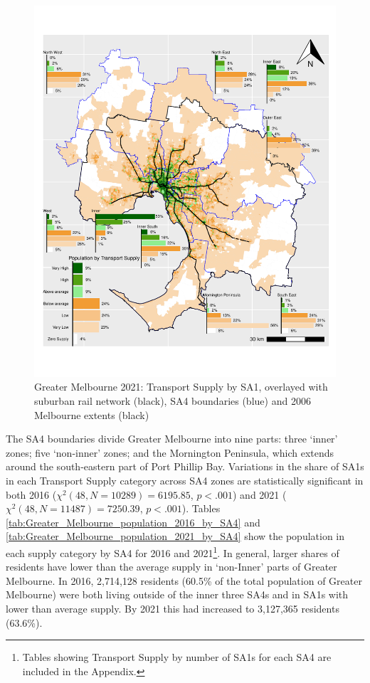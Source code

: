\documentclass[preprint, 3p,
authoryear]{elsarticle} %
\begin{document}
\begin{figure}
\includegraphics[width=1\linewidth]{ReynoldsCurrieQu2024_files/figure-latex/Greater_Melbourne_population_2021_by_SA4-1} \caption{Greater Melbourne 2021: Transport Supply by SA1,  overlayed with suburban rail network (black), SA4 boundaries (blue) and 2006 Melbourne extents (black)}\label{fig:Greater_Melbourne_population_2021_by_SA4}
\end{figure}

The SA4 boundaries divide Greater Melbourne into nine parts: three
`inner' zones; five `non-inner' zones; and the Mornington Peninsula,
which extends around the south-eastern part of Port Phillip Bay.
Variations in the share of SA1s in each Transport Supply category across
SA4 zones are statistically significant in both 2016
(\(\chi^2(48, N = 10289) = 6195.85\), \(p < .001\)) and 2021
(\(\chi^2(48, N = 11487) = 7250.39\), \(p < .001\)). Tables
\ref{tab:Greater_Melbourne_population_2016_by_SA4} and
\ref{tab:Greater_Melbourne_population_2021_by_SA4} show the population
in each supply category by SA4 for 2016 and 2021\footnote{Tables showing
  Transport Supply by number of SA1s for each SA4 are included in the
  Appendix.}. In general, larger shares of residents have lower than the
average supply in `non-Inner' parts of Greater Melbourne. In 2016,
2,714,128 residents (60.5\% of the total population of Greater
Melbourne) were both living outside of the inner three SA4s and in SA1s
with lower than average supply. By 2021 this had increased to 3,127,365
residents (63.6\%).
\end{document}
